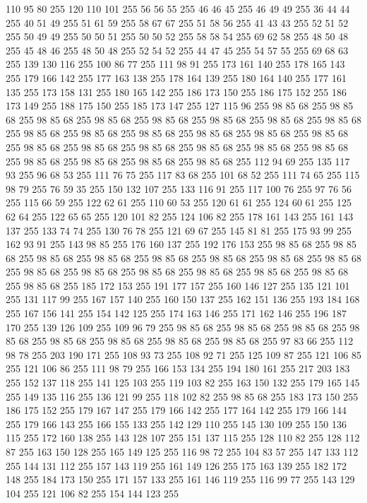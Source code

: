 110 95 80 255 120 110 101 255 56 56 55 255 46 46 45 255 46 49 49 255 36 44 44 255 40 51 49 255 51 61 59 255 58 67 67 255 51 58 56 255 41 43 43 255 52 51 52 255 50 49 49 255 50 50 51 255 50 50 52 255 58 58 54 255 69 62 58 255 48 50 48 255 45 48 46 255 48 50 48 255 52 54 52 255 44 47 45 255 54 57 55 255 69 68 63 255 139 130 116 255 100 86 77 255 111 98 91 255 173 161 140 255 178 165 143 255 179 166 142 255 177 163 138 255 178 164 139 255 180 164 140 255 177 161 135 255 173 158 131 255 180 165 142 255 186 173 150 255 186 175 152 255 186 173 149 255 188 175 150 255 185 173 147 255 127 115 96 255 98 85 68 255 98 85 68 255 98 85 68 255 98 85 68 255 98 85 68 255 98 85 68 255 98 85 68 255 98 85 68 255 98 85 68 255 98 85 68 255 98 85 68 255 98 85 68 255 98 85 68 255 98 85 68 255 98 85 68 255 98 85 68 255 98 85 68 255 98 85 68 255 98 85 68 255 98 85 68 255 98 85 68 255 98 85 68 255
98 85 68 255 98 85 68 255 112 94 69 255 135 117 93 255 96 68 53 255 111 76 75 255 117 83 68 255 101 68 52 255 111 74 65 255 115 98 79 255 76 59 35 255 150 132 107 255 133 116 91 255 117 100 76 255 97 76 56 255 115 66 59 255 122 62 61 255 110 60 53 255 120 61 61 255 124 60 61 255 125 62 64 255 122 65 65 255 120 101 82 255 124 106 82 255 178 161 143 255 161 143 137 255 133 74 74 255 130 76 78 255 121 69 67 255 145 81 81 255 175 93 99 255 162 93 91 255 143 98 85 255 176 160 137 255 192 176 153 255 98 85 68 255 98 85 68 255 98 85 68 255 98 85 68 255 98 85 68 255 98 85 68 255 98 85 68 255 98 85 68 255 98 85 68 255 98 85 68 255 98 85 68 255 98 85 68 255 98 85 68 255 98 85 68 255 98 85 68 255 185 172 153 255 191 177 157 255 160 146 127 255 135 121 101 255 131 117 99 255 167 157 140 255 160 150 137 255 162 151 136 255 193 184 168 255 167 156 141 255 154 142 125 255 174 163 146 255 171 162 146 255 196 187 170 255
139 126 109 255 109 96 79 255 98 85 68 255 98 85 68 255 98 85 68 255 98 85 68 255 98 85 68 255 98 85 68 255 98 85 68 255 98 85 68 255 97 83 66 255 112 98 78 255 203 190 171 255 108 93 73 255 108 92 71 255 125 109 87 255 121 106 85 255 121 106 86 255 111 98 79 255 166 153 134 255 194 180 161 255 217 203 183 255 152 137 118 255 141 125 103 255 119 103 82 255 163 150 132 255 179 165 145 255 149 135 116 255 136 121 99 255 118 102 82 255 98 85 68 255 183 173 150 255 186 175 152 255 179 167 147 255 179 166 142 255 177 164 142 255 179 166 144 255 179 166 143 255 166 155 133 255 142 129 110 255 145 130 109 255 150 136 115 255 172 160 138 255 143 128 107 255 151 137 115 255 128 110 82 255 128 112 87 255 163 150 128 255 165 149 125 255 116 98 72 255 104 83 57 255 147 133 112 255 144 131 112 255 157 143 119 255 161 149 126 255 175 163 139 255 182 172 148 255 184 173 150 255 171 157 133 255 161 146 119 255 116 99 77 255 143 129 104 255 121 106 82 255 154 144 123 255

